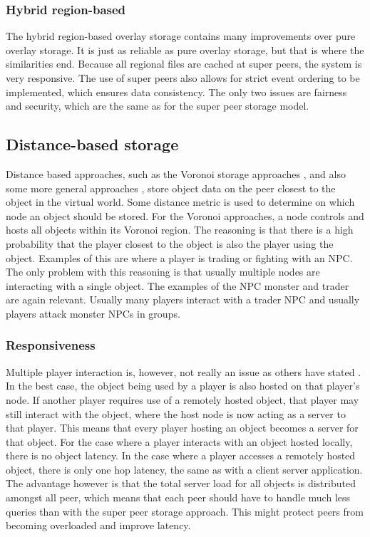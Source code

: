 \documentclass[journal,oneside,a4paper,onecolumn]{IEEEtran}
\begin{document}
\subsubsection{Hybrid region-based}
The hybrid region-based overlay storage contains many improvements over pure overlay storage. It is just as reliable as pure overlay storage, but that is where the similarities end. Because all regional files are cached at super peers, the system is very responsive. The use of super peers also allows for strict event ordering to be implemented, which ensures data consistency. The only two issues are fairness and security, which are the same as for the super peer storage model.

\subsection{Distance-based storage}

Distance based approaches, such as the Voronoi storage approaches \cite{Buyukkaya_voronoi_state_management}, \cite{Hu_voronoi_IM} and also some more general approaches \cite{colyseus_distance_based}, store object data on the peer closest to the object in the virtual world. Some distance metric is used to determine on which node an object should be stored. For the Voronoi approaches, a node controls and hosts all objects within its Voronoi region. The reasoning is that there is a high probability that the player closest to the object is also the player using the object. Examples of this are where a player is trading or fighting with an NPC. The only problem with this reasoning is that usually multiple nodes are interacting with a single object. The examples of the NPC monster and trader are again relevant. Usually many players interact with a trader NPC and usually players attack monster NPCs in groups.

\subsubsection{Responsiveness}
Multiple player interaction is, however, not really an issue as others have stated \cite{Fan_deisgn_issues_p2p}. In the best case, the object being used by a player is also hosted on that player's node. If another player requires use of a remotely hosted object, that player may still interact with the object, where the host node is now acting as a server to that player. This means that every player hosting an object becomes a server for that object. For the case where a player interacts with an object hosted locally, there is no object latency. In the case where a player accesses a remotely hosted object, there is only one hop latency, the same as with a client server application. The advantage however is that the total server load for all objects is distributed amongst all peer, which means that each peer should have to handle much less queries than with the super peer storage approach. This might protect peers from becoming overloaded and improve latency.
\end{document}
